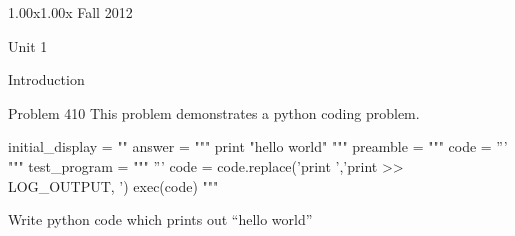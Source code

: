 \documentclass[12pt]{article}
\begin{document}
\begin{edXcourse}{1.00x}{1.00x Fall 2012}
\begin{edXchapter}{Unit 1}
\begin{edXsection}{Introduction}
\begin{edXproblem}{Problem 4}{10}
This problem demonstrates a python coding problem.

\begin{edXscript}
initial_display = ""
answer = """
print "hello world"
"""
preamble = """ 
code = '''
"""
test_program = """
'''
code = code.replace('print ','print >> LOG_OUTPUT, ')
exec(code)
"""
\end{edXscript}

Write python code which prints out ``hello world''


\end{edXproblem}


\end{edXsection}
\end{edXchapter}
\end{edXcourse}

\end{document}
